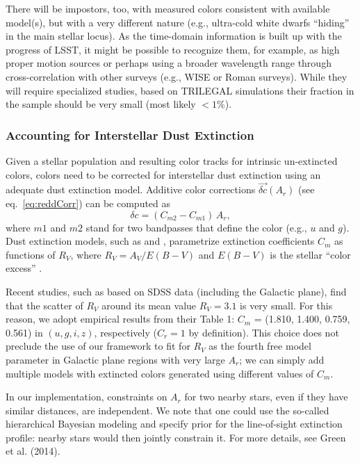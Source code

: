 There will be impostors, too, with measured colors consistent with available model(s), but
with a very different nature (e.g., ultra-cold white dwarfs ``hiding'' in the main stellar locus).
As the time-domain information is built up with the progress of LSST, 
it might be possible to recognize them, for example, as high proper motion sources or perhaps
using a broader wavelength range through cross-correlation with other surveys (e.g., WISE or
Roman surveys). While they will require specialized studies, based on TRILEGAL simulations
their fraction in the sample should be very small (most likely $<1$\%). 


\subsubsection{Accounting for Interstellar Dust Extinction} 

Given a stellar population and resulting color tracks for intrinsic un-extincted colors, colors need to
be corrected for interstellar dust extinction using an adequate dust extinction model. Additive color
corrections $\vec{\delta c}(A_r)$ (see eq.~\ref{eq:reddCorr}) can be computed as 
\begin{equation}
 \label{eq:extCorr} 
                      \delta c = (C_{m2}- C_{m1}) \, A_r,
\end{equation}
where $m1$ and $m2$ stand for two bandpasses that define the color (e.g., $u$ and $g$).  
Dust extinction models, such as \cite{1989ApJ...345..245C} and
\cite{1999PASP..111...63F}, parametrize extinction coefficients $C_{m}$ as functions of $R_V$, where
$R_V = A_V/E(B-V)$ and $E(B-V)$ is the stellar ``color excess'' \citep{1989ApJ...345..245C}.

Recent studies, such as \cite{2012ApJ...757..166B} based on SDSS data (including the Galactic plane), 
find that the scatter of $R_V$ around its mean value $R_V=3.1$ is very small. For this reason, we adopt
empirical results from their Table 1: $C_m$ = (1.810, 1.400, 0.759, 0.561) in $(u, g, i, z)$, respectively ($C_r=1$
by definition). This choice does not preclude the use of our framework to fit for $R_V$ as the fourth free
model parameter in Galactic plane regions with very large $A_r$; we  can simply add multiple models
with extincted colors generated using different values of $C_m$. 

In our implementation, constraints on $A_r$ for two nearby stars, even if they have similar distances,
are independent. We note that one could use the so-called hierarchical Bayesian modeling  and specify prior
for the line-of-sight extinction profile: nearby stars would then jointly constrain it. For more
details, see Green et al. (2014).

